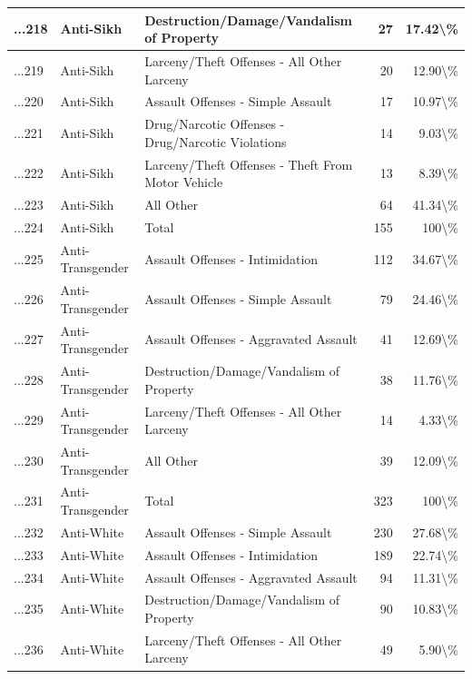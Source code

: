 \documentclass[
]{krantz}
\begin{document}
\begin{longtable}[t]{l|l|l|r|r}
\hline
...218 & Anti-Sikh & Destruction/Damage/Vandalism of Property & 27 & 17.42\textbackslash{}\%\\
\hline
...219 & Anti-Sikh & Larceny/Theft Offenses - All Other Larceny & 20 & 12.90\textbackslash{}\%\\
\hline
...220 & Anti-Sikh & Assault Offenses - Simple Assault & 17 & 10.97\textbackslash{}\%\\
\hline
...221 & Anti-Sikh & Drug/Narcotic Offenses - Drug/Narcotic Violations & 14 & 9.03\textbackslash{}\%\\
\hline
...222 & Anti-Sikh & Larceny/Theft Offenses - Theft From Motor Vehicle & 13 & 8.39\textbackslash{}\%\\
\hline
...223 & Anti-Sikh & All Other & 64 & 41.34\textbackslash{}\%\\
\hline
...224 & Anti-Sikh & Total & 155 & 100\textbackslash{}\%\\
\hline
...225 & Anti-Transgender & Assault Offenses - Intimidation & 112 & 34.67\textbackslash{}\%\\
\hline
...226 & Anti-Transgender & Assault Offenses - Simple Assault & 79 & 24.46\textbackslash{}\%\\
\hline
...227 & Anti-Transgender & Assault Offenses - Aggravated Assault & 41 & 12.69\textbackslash{}\%\\
\hline
...228 & Anti-Transgender & Destruction/Damage/Vandalism of Property & 38 & 11.76\textbackslash{}\%\\
\hline
...229 & Anti-Transgender & Larceny/Theft Offenses - All Other Larceny & 14 & 4.33\textbackslash{}\%\\
\hline
...230 & Anti-Transgender & All Other & 39 & 12.09\textbackslash{}\%\\
\hline
...231 & Anti-Transgender & Total & 323 & 100\textbackslash{}\%\\
\hline
...232 & Anti-White & Assault Offenses - Simple Assault & 230 & 27.68\textbackslash{}\%\\
\hline
...233 & Anti-White & Assault Offenses - Intimidation & 189 & 22.74\textbackslash{}\%\\
\hline
...234 & Anti-White & Assault Offenses - Aggravated Assault & 94 & 11.31\textbackslash{}\%\\
\hline
...235 & Anti-White & Destruction/Damage/Vandalism of Property & 90 & 10.83\textbackslash{}\%\\
\hline
...236 & Anti-White & Larceny/Theft Offenses - All Other Larceny & 49 & 5.90\textbackslash{}\%\\
\hline

\end{longtable}
\end{document}
